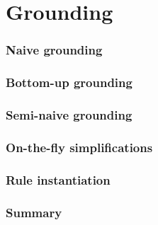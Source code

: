 \part{Grounding}


\section{Naive grounding}

\section{Bottom-up grounding}

\section{Semi-naive grounding}

\section{On-the-fly simplifications}

\section{Rule instantiation}

\section{Summary}

%
